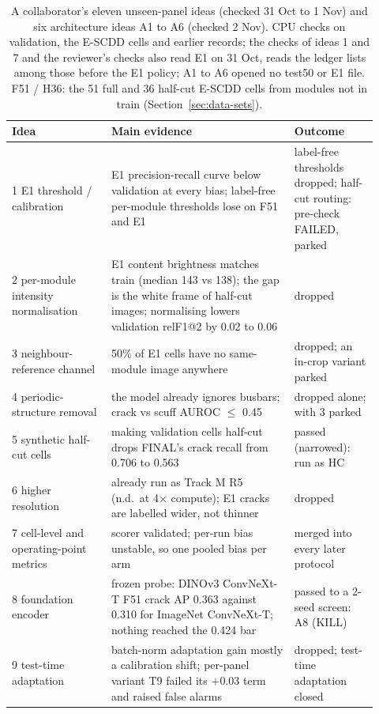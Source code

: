 \begin{table}[htbp]
\centering
\scriptsize
\caption[A collaborator's eleven unseen-panel ideas (31 Oct to 1 Nov) and A1 to A6 (1 to 2 Nov)]{A collaborator's eleven
unseen-panel ideas (checked 31 Oct to 1 Nov) and six architecture ideas A1 to A6 (checked 2 Nov). CPU checks on validation, the
E-SCDD cells and earlier records; the checks of ideas 1 and 7 and the reviewer's checks also read E1 on 31 Oct, reads the ledger lists among those before
the E1 policy; A1 to A6 opened no test50 or E1 file. F51 / H36: the 51 full and 36 half-cut E-SCDD cells from modules not in
train (Section~\ref{sec:data-sets}).}
\label{tab:midnov-ideas}
\begin{tabular}{@{}p{0.25\linewidth}p{0.46\linewidth}p{0.21\linewidth}@{}}
\toprule
Idea & Main evidence & Outcome \\
\midrule
1 E1 threshold / calibration & E1 precision-recall curve below validation at every bias; label-free per-module thresholds lose on F51 and E1 & label-free thresholds dropped; half-cut routing: pre-check FAILED, parked \\
2 per-module intensity normalisation & E1 content brightness matches train (median 143 vs 138); the gap is the white frame of half-cut images; normalising lowers validation relF1@2 by 0.02 to 0.06 & dropped \\
3 neighbour-reference channel & 50\% of E1 cells have no same-module image anywhere & dropped; an in-crop variant parked \\
4 periodic-structure removal & the model already ignores busbars; crack vs scuff AUROC $\leq$ 0.45 & dropped alone; with 3 parked \\
5 synthetic half-cut cells & making validation cells half-cut drops FINAL's crack recall from 0.706 to 0.563 & passed (narrowed): run as HC \\
6 higher resolution & already run as Track M R5 (n.d.\ at 4$\times$ compute); E1 cracks are labelled wider, not thinner & dropped \\
7 cell-level and operating-point metrics & scorer validated; per-run bias unstable, so one pooled bias per arm & merged into every later protocol \\
8 foundation encoder & frozen probe: DINOv3 ConvNeXt-T F51 crack AP 0.363 against 0.310 for ImageNet ConvNeXt-T; nothing reached the 0.424 bar & passed to a 2-seed screen: A8 (KILL) \\
9 test-time adaptation & batch-norm adaptation gain mostly a calibration shift; per-panel variant T9 failed its $+0.03$ term and raised false alarms & dropped; test-time adaptation closed \\

\end{tabular}
\end{table}
